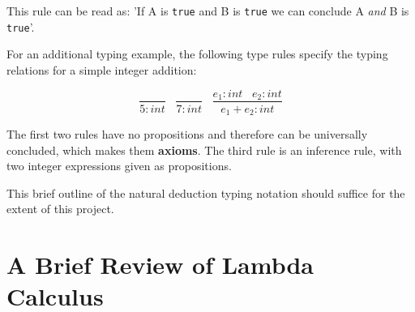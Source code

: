 \documentclass{l4proj}
\begin{document}
This rule can be read as: 'If A is \texttt{true} and B is \texttt{true} we can conclude A \emph{and} B is \texttt{true}'.

For an additional typing example, the following type rules specify the typing relations for a simple integer addition:

\begin{equation} \label{eq:add-type-rule}
\frac{}{5 : int} \;\;\; \frac{}{7 : int} \;\;\; \frac{e_1 : int \;\;\; e_2 : int}{e_1 + e_2 : int}
\end{equation}

The first two rules have no propositions and therefore can be universally concluded, which makes them \textbf{axioms}.
The third rule is an inference rule, with two integer expressions given as propositions.

This brief outline of the natural deduction typing notation should suffice for the extent of this project. 









\section{A Brief Review of Lambda Calculus} \label{sec:lambda-review}
\end{document}
